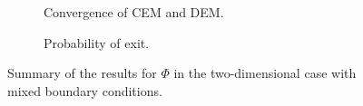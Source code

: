 \begin{figure}[t]
    \centering
    \begin{subfigure}{0.49\linewidth}
        \centering
        \resizebox{1\linewidth}{!}{ }  
        \caption{Convergence of CEM and DEM.}
        \label{fig:ReflTwoDPhi}
    \end{subfigure}
    \begin{subfigure}{0.49\linewidth}
        \centering
        \resizebox{1\linewidth}{!}{ }  
        \caption{Probability of exit.}
        \label{fig:PhiExact2DRefl}
    \end{subfigure}    
    \caption{Summary of the results for $\Phi$ in the two-dimensional case with mixed boundary conditions.}
    \label{fig:OrdersTwoDKillPhi}
\end{figure}
